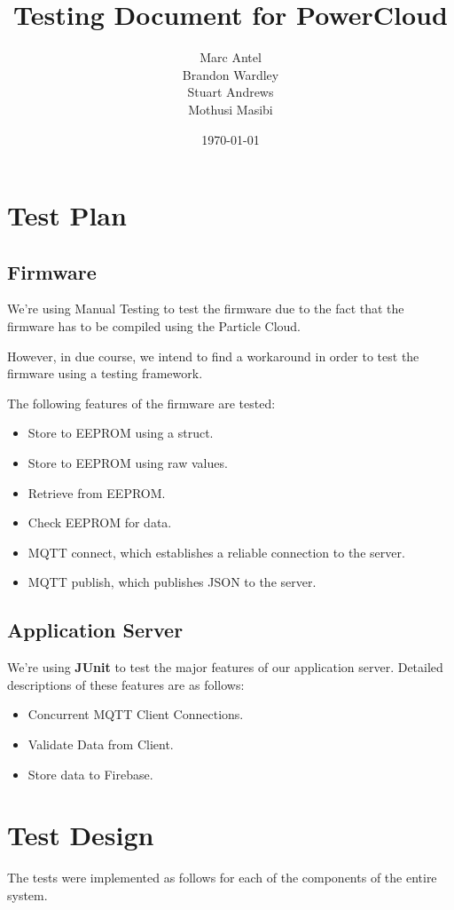 \documentclass[a4paper,10pt]{article}
\title{Testing Document for PowerCloud}
\author{Marc Antel\\ Brandon Wardley\\ Stuart Andrews\\ Mothusi Masibi}
\date{\today}
\begin{document}
	\maketitle
	\newpage
	\section{Test Plan}
		\subsection{Firmware}
			We're using Manual Testing to test the firmware due to the fact that the firmware has to be compiled using the Particle Cloud.
			
			However, in due course, we intend to find a workaround in order to test the firmware using a testing framework.
			
			The following features of the firmware are tested:
			\begin{itemize}
				\item Store to EEPROM using a struct.
				\item Store to EEPROM using raw values.
				\item Retrieve from EEPROM.
				\item Check EEPROM for data.
				\item MQTT connect, which establishes a reliable connection to the server.
				\item MQTT publish, which publishes JSON to the server.
			\end{itemize}
			
		\subsection{Application Server}
			We're using \textbf{JUnit} to test the major features of our application server.
			Detailed descriptions of these features are as follows:
				\begin{itemize}
					\item Concurrent MQTT Client Connections.
					\item Validate Data from Client.
					\item Store data to Firebase.
				\end{itemize}
				
	\section{Test Design}
	The tests were implemented as follows for each of the components of the entire system.
\end{document}

